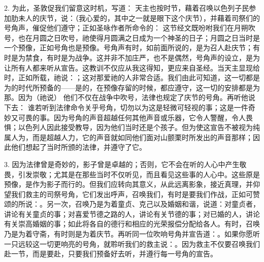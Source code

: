 2. 为此，圣敦促我们留意这时机，写道： 天主也按时节，藉着召唤以色列子民参加肋未人的庆节，说：（我心爱的，其中之一就是眼下这个庆节），并藉着司祭们的号角声，催促他们遵守；正如圣咏作者所命令的： 这节经文既吩咐我们在月朔吹号，也在月圆之日吹号，祂使得月圆满之日成为一个神圣的日子；月圆之日当时是一个预像，正如号角也是预像。号角声有时，如前面所说的，是为召人赴庆节；有时是为禁食，有时是为战争。这并非不加庄严，也不是偶然，号角声的设立，是为让所有人都来听从宣告。这教训不仅应从我这得知，更应来自圣经。当天主显现给时，正如所载，祂说：；这对那爱祂的人非常合适。我们由此可知道，这一切都是为的时代所预备的——是的，在预像存留的时候，都应遵守，这一切的安排都是为那。因为（祂说） 他们不仅在战争中吹号，法律也规定了庆节的号角。再听他说下去： 谁若听到法律命令关乎号角，切勿以为这是轻微可轻视的事；这是一件奇妙又可畏的事。因为号角的声音超越任何其他声音或乐器，它令人警醒，令人畏惧；以色列人因此接受教导，因为他们当时还是个孩子。但为使这宣告不被视为纯属人为，而是超越人力，它的声音就如同他们面对山颤栗时所发出的声音那样；因此他们想起了当时所颁的法律，并遵守了它。\par

3. 因为法律曾是奇妙的，影子曾是卓越的；否则，它不会在听的人心中产生敬畏，引发崇敬；尤其是在那些当时不仅听见，而且看见这些事的人心中。这些原是预像，是作为影子而行的。但我们应转向其意义，从此远离影象，接近真理，并仰望我们救主的司祭号角，它们发出呼声，召唤我们，有时是要我们作战，正如可赞颂的所说：。另一次，召唤乃是为着童贞、克己以及婚姻和谐，说道：对童贞者，讲论有关童贞的事；对喜爱节德之路的人，讲论有关节德的事；对已婚的人，讲论有关崇高婚姻的事；如此将各自的德行和相应的光荣报偿分配给各人。有时，召唤乃是为着守斋，有时则是为着庆节。再听同一位吹响号角并宣告道：。如果你愿听一只远较这一切更响亮的号角，就聆听我们的救主说：。因为救主不仅要召唤我们赴一节，而是要赴，只要我们预备好去听，并遵行每一号角的宣告。\par

